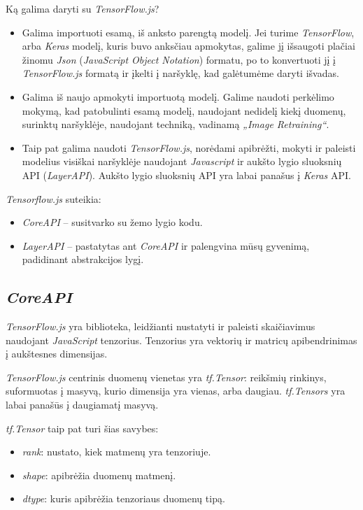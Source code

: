 \documentclass{VUMIFInfKursinis}
\begin{document}
Ką galima daryti su \textit{TensorFlow.js}?

\begin{itemize}
  \item Galima importuoti esamą, iš anksto parengtą modelį. Jei turime  \textit{TensorFlow}, arba \textit{Keras} modelį, kuris buvo anksčiau apmokytas, galime jį išsaugoti plačiai žinomu \textit{Json} (\textit{JavaScript Object Notation}) formatu, po to konvertuoti jį į \textit{TensorFlow.js} formatą ir įkelti į naršyklę, kad galėtumėme daryti išvadas.
  \item Galima iš naujo apmokyti importuotą modelį. Galime naudoti perkėlimo mokymą, kad patobulinti esamą modelį, naudojant nedidelį kiekį duomenų, surinktų naršyklėje, naudojant techniką, vadinamą \textit{„Image Retraining“}.
  \item Taip pat galima naudoti \textit{TensorFlow.js}, norėdami apibrėžti, mokyti ir paleisti modelius visiškai naršyklėje naudojant \textit{Javascript} ir aukšto lygio sluoksnių API (\textit{LayerAPI}). Aukšto lygio sluoksnių API yra labai panašus į \textit{Keras} API.
\end{itemize} 

\textit{Tensorflow.js} suteikia\cite{12}:

\begin{itemize}
  \item \textit{CoreAPI} -- susitvarko su žemo lygio kodu.
  \item \textit{LayerAPI} -- pastatytas ant \textit{CoreAPI} ir palengvina mūsų gyvenimą, padidinant abstrakcijos lygį.
\end{itemize} 

\subsection{\textit{CoreAPI}}

\textit{TensorFlow.js} yra biblioteka, leidžianti nustatyti ir paleisti skaičiavimus naudojant \textit{JavaScript} tenzorius. Tenzorius yra vektorių ir matricų apibendrinimas į aukštesnes  dimensijas. 
\par
\textit{TensorFlow.js} centrinis duomenų vienetas yra \textit{tf.Tensor}: reikšmių rinkinys, suformuotas į masyvą, kurio dimensija yra vienas, arba daugiau. \textit{tf.Tensors} yra labai panašūs į daugiamatį masyvą.\cite{9}
\par
\textit{tf.Tensor} taip pat turi šias savybes:

\begin{itemize}
  \item \textit{rank}: nustato, kiek matmenų yra tenzoriuje.
  \item \textit{shape}: apibrėžia duomenų matmenį.
  \item \textit{dtype}: kuris apibrėžia tenzoriaus duomenų tipą.
\end{itemize} 
\end{document}
